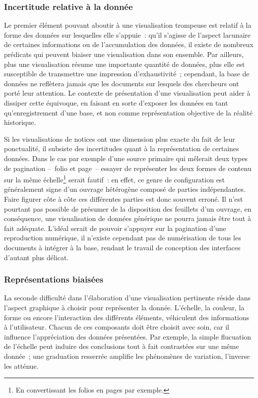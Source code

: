 \documentclass[a4paper,12pt,twoside]{book}
\newcommand{\bdd}{base de données\xspace}
\begin{document}
			\subsubsection{Incertitude relative à la donnée}
Le premier élément pouvant aboutir à une visualisation trompeuse est relatif à la forme des données sur lesquelles elle s'appuie~: qu'il s'agisse de l'aspect lacunaire de certaines informations ou de l'accumulation des données, il existe de nombreux prédicats qui peuvent biaiser une visualisation dans son ensemble. Par ailleurs, plus une visualisation résume une importante quantité de données, plus elle est susceptible de transmettre une impression d'exhaustivité~; cependant, la \bdd ne reflètera jamais que les documents sur lesquels des chercheurs ont porté leur attention. Le contexte de présentation d'une visualisation peut aider à dissiper cette équivoque, en faisant en sorte d'exposer les données en tant qu'enregistrement d'une base, et non comme représentation objective de la réalité historique.

Si les visualisations de notices ont une dimension plus exacte du fait de leur ponctualité, il subsiste des incertitudes quant à la représentation de certaines données. Dans le cas par exemple d'une source primaire qui mêlerait deux types de pagination –~folio et page~– essayer de représenter les deux formes de contenu sur la même échelle\footnote{En convertissant les folios en pages par exemple.} serait fautif~: en effet, ce genre de configuration est généralement signe d'un ouvrage hétérogène composé de parties indépendantes. Faire figurer côte à côte ces différentes parties est donc souvent erroné. Il n'est pourtant pas possible de présumer de la disposition des feuillets d'un ouvrage, en conséquence, une visualisation de données générique ne pourra jamais être tout à fait adéquate. L'idéal serait de pouvoir s'appuyer sur la pagination d'une reproduction numérique, il n'existe cependant pas de numérisation de tous les documents à intégrer à la base, rendant le travail de conception des interfaces d'autant plus délicat.

			\subsubsection{Représentations biaisées}
La seconde difficulté dans l'élaboration d'une visualisation pertinente réside dans l'aspect graphique à choisir pour représenter la donnée. L'échelle, la couleur, la forme ou encore l'interaction des différents éléments, véhiculent des informations à l'utilisateur. Chacun de ces composants doit être choisit avec soin, car il influence l'appréciation des données présentées. Par exemple, la simple flucuation de l'échelle peut induire des conclusions tout à fait contrastées sur une même donnée~; une graduation resserrée amplifie les phénomènes de variation, l'inverse les atténue.
\end{document}
